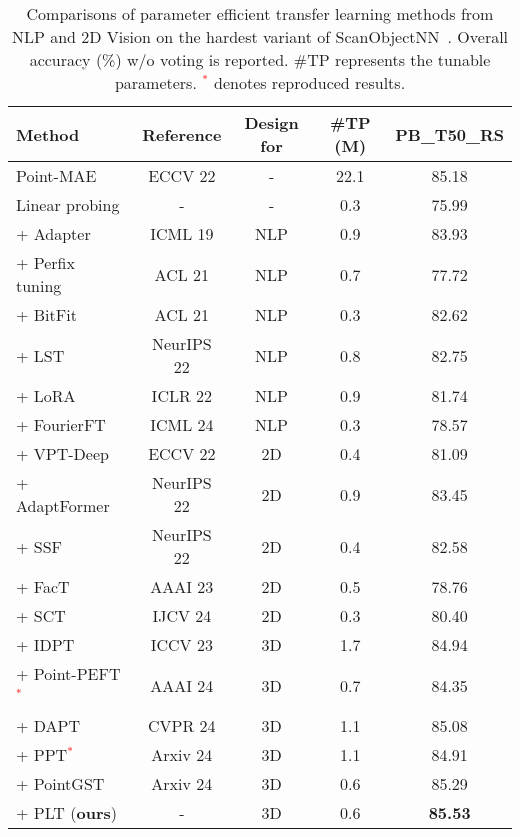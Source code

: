 \begin{table}
\scriptsize
\setlength{\tabcolsep}{1.9mm}
\centering
\caption{Comparisons of parameter efficient transfer learning methods from NLP and 2D Vision on the hardest variant of ScanObjectNN~\cite{uy2019revisiting}. Overall accuracy (\%) w/o voting is reported. \#TP represents the tunable parameters. \textcolor{red}{$^*$} denotes reproduced results.}
\label{tab:compare}
\begin{tabular}{ lcccc }
\toprule
 Method &Reference& Design for &\#TP (M) & PB\_T50\_RS \\
\midrule
 Point-MAE~\cite{pang2022masked}  &ECCV 22 & - & 22.1 & 85.18  \\
 Linear probing &- & - & 0.3& 75.99\\
 \midrule
  + Adapter~\cite{houlsby2019parameter}&ICML 19 & NLP & 0.9 & 83.93 \\
  + Perfix tuning~\cite{li2021prefix}& ACL 21 & NLP &0.7 & 77.72  \\
  + BitFit~\cite{zaken2022bitfit} & ACL 21 & NLP &0.3 & 82.62    \\
  + LST~\cite{sung2022lst} & NeurIPS 22 & NLP & 0.8 & 82.75\\
  + LoRA~\cite{hu2021lora} & ICLR 22 & NLP & 0.9&  81.74   \\
  + FourierFT~\cite{Gao2024Fourier} & ICML 24 & NLP &0.3 & 78.57\\
  \midrule
  + VPT-Deep~\cite{jia2022visual}&ECCV 22 & 2D &0.4 &  81.09 \\
  + AdaptFormer~\cite{chen2022adaptformer} &NeurIPS 22 & 2D &0.9  & 83.45 \\
  + SSF~\cite{lian2022scaling} & NeurIPS 22 & 2D &0.4  & 82.58\\
  + FacT~\cite{jie2023fact} & AAAI 23 & 2D & 0.5 & 78.76\\
  + SCT~\cite{zhao2024sct} & IJCV 24 & 2D & 0.3 & 80.40\\
  \midrule
  + IDPT~\cite{zha2023instance} &ICCV 23 & 3D & 1.7 &84.94\\
  + Point-PEFT\textcolor{red}{$^*$}~\cite{tang2024point} & AAAI 24 & 3D & 0.7 &84.35\\
  + DAPT~\cite{zhou2024dynamic} & CVPR 24 & 3D & 1.1 & 85.08 \\
  + PPT\textcolor{red}{$^*$}~\cite{zhang2024positional} & Arxiv 24 & 3D & 1.1 & 84.91\\
  + PointGST~\cite{liang2024parameter} & Arxiv 24 & 3D & 0.6 & 85.29\\
  \rowcolor{linecolor!40}+ PLT (\textbf{ours}) & - & 3D & 0.6 & \textbf{85.53} \\
\bottomrule
\end{tabular}
\end{table}
